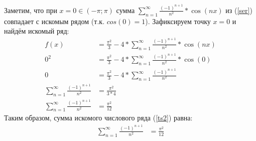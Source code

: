 \documentclass[12pt, a4paper]{article}
\begin{document}
Заметим, что при $x=0\in\left(-\pi;\pi\right)$ сумма $\sum_{n=1}^{\infty}\frac{(-1)^{n+1}}{n^2}*\cos(nx)$ из (\ref{ser}) совпадает с искомым рядом (т.к. $cos(0)=1$). Зафиксируем точку $x=0$ и найдём искомый ряд:
 \begin{equation*}
\begin{aligned}
f(x)&= \frac{\pi^2}{3}-4*\sum_{n=1}^{\infty}\frac{(-1)^{n+1}}{n^2}*\cos(nx)\\
0^2 &= \frac{\pi^2}{3}-4*\sum_{n=1}^{\infty}\frac{(-1)^{n+1}}{n^2}*\cos(0)\\
0 &= \frac{\pi^2}{3} -4*\sum_{n=1}^{\infty}\frac{(-1)^{n+1}}{n^2}\\
\sum_{n=1}^{\infty}\frac{(-1)^{n+1}}{n^2} &= \frac{\pi^2}{3*4}\\
\sum_{n=1}^{\infty}\frac{(-1)^{n+1}}{n^2} &= \frac{\pi^2}{12}
\end{aligned}
\end{equation*}
Таким образом, сумма искомого числового ряда (\ref{ts2}) равна:
 \begin{equation*}
\begin{aligned}
\sum_{n=1}^{\infty}\frac{(-1)^{n+1}}{n^2} &= \frac{\pi^2}{12}
\end{aligned}
\end{equation*}
\end{document}
